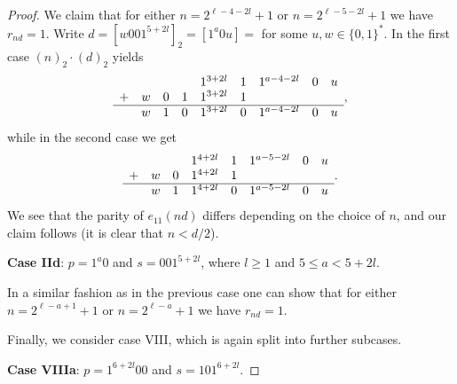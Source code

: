 \documentclass[a4paper,11pt]{amsart}
\theoremstyle{definition}
\begin{document}
\begin{proof}
We claim that for either $n = 2^{\ell-4-2l}+1$ or $n = 2^{\ell-5-2l}+1$ we have $r_{nd} = 1$.
Write  $d = [w 00 1^{5+2l}]_2 = [1^a0u] = $ for some $u,w \in \{0,1\}^*$.
In the first case $(n)_2 \cdot (d)_2$ yields
$$ \begin{array}{lllllllll}
       &    &   &   & 1^{3+2l} & 1  & 1^{a-4-2l} & 0 & u \\
+      &  w & 0 & 1 & 1^{3+2l} & 1  &           &   &   \\
\hline &  w & 1 & 0 & 1^{3+2l} & 0  & 1^{a-4-2l} & 0 & u         
\end{array}, $$
while in the second case we get
$$\begin{array}{llllllllll}
       &   &   & 1^{4+2l} & 1   & 1^{a-5-2l} & 0 & u \\
+      & w & 0 & 1^{4+2l} & 1   &         &   &   \\
\hline
	   & w & 1 & 1^{4+2l} & 0   & 1^{a-5-2l} & 0 & u     
\end{array}.$$
We see that the parity of $e_{11}(nd)$ differs depending on the choice of $n$, and our claim follows (it is clear that $n < d/2$).

\textbf{Case IId}: $p = 1^{a}0$ and $s=001^{5+2l}$, where $l \geq 1$ and $5 \leq a < 5+2l$.

In a similar fashion as in the previous case one can show that for either $n = 2^{\ell-a+1}+1$ or $n = 2^{\ell-a}+1$ we have $r_{nd} = 1$.

Finally, we consider case VIII, which is again split into further subcases.

\textbf{Case VIIIa}: $p = 1^{6+2l}00$ and $s=101^{6+2l}$.


\end{proof}
\end{document}
